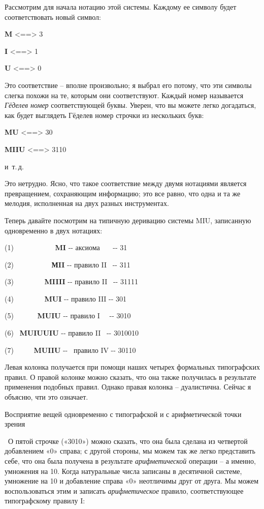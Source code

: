 \documentclass[../main.tex]{subfiles}
\begin{document}
Рассмотрим для начала нотацию этой системы. Каждому ее символу будет соответствовать новый символ:

\textbf{M} \textless==\textgreater{} 3

\textbf{I} \textless==\textgreater{} 1

\textbf{U} \textless==\textgreater{} 0

Это соответствие \--- вполне произвольно; я выбрал его потому, что эти символы слегка похожи на те, которым они соответствуют. Каждый номер называется \emph{Гёделев номер} соответствующей буквы. Уверен, что вы можете легко догадаться, как будет выглядеть Гёделев номер строчки из нескольких букв:

\textbf{MU} \textless==\textgreater{} 30

\textbf{MIIU} \textless==\textgreater{} 3110

и~т.\,д.

Это нетрудно. Ясно, что такое соответствие между двумя нотациями является превращением, сохраняющим информацию; это все равно, что одна и та же мелодия, исполненная на двух разных инструментах.

Теперь давайте посмотрим на типичную деривацию системы MIU, записанную одновременно в двух нотациях:

(1)~~~~~~~~~~~ \textbf{MI} -\/- аксиома~~~ -\/- 31

(2)~~~~~~~~~~ \textbf{МII} -\/- правило II~ -\/- 311

(3)~~~~~~~~ \textbf{MIIII} -\/- правило II~ -\/- 31111

(4)~~~~~~~~ \textbf{MUI} -\/- правило III -\/- 301

(5)~~~~~~ \textbf{MUIU} -\/- правило I~~ -\/- 3010

(6)~ \textbf{MUIUUIU} -\/- правило II~ -\/- 3010010

(7)~~~~~ \textbf{MUIIU} -\/-~ правило IV -\/- 30110

Левая колонка получается при помощи наших четырех формальных типографских правил. О правой колонке можно сказать, что она также получилась в результате применения подобных правил. Однако правая колонка \--- дуалистична. Сейчас я объясню, чти это означает.

Восприятие вещей одновременно с типографской и с арифметической точки зрения

~О пятой строчке («3010») можно сказать, что она была сделана из четвертой добавлением «0» справа; с другой стороны, мы можем так же легко представить себе, что она была получена в результате \emph{арифметической} операции \--- а именно, умножения на 10. Когда натуральные числа записаны в десятичной системе, умножение на 10 и добавление справа «0» неотличимы друг от друга. Мы можем воспользоваться этим и записать \emph{арифметическое} правило, соответствующее типографскому правилу I:
\end{document}
